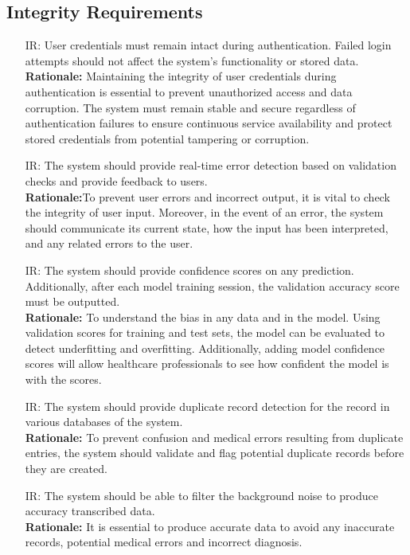 \documentclass{article}
\newcounter{irnum} %
\begin{document}
\subsection{Integrity Requirements}
\begin{itemize}
    \item [IR\refstepcounter{irnum}\theirnum \label{IR_Autentication}:] User credentials must remain intact during authentication. Failed login attempts should not affect the system's functionality or stored data.\\
    \textbf{Rationale:} Maintaining the integrity of user credentials during authentication is essential to prevent unauthorized access and data corruption. The system must remain stable and secure regardless of authentication failures to ensure continuous service availability and protect stored credentials from potential tampering or corruption.

    \item [IR\refstepcounter{irnum}\theirnum \label{IR_ErrorDetection}:] The system should provide real-time error detection based on validation checks and provide feedback to users.\\
    \textbf{Rationale:}To prevent user errors and incorrect output, it is vital to check the integrity of user input. Moreover, in the event of an error, the system should communicate its current state, how the input has been interpreted, and any related errors to the user.

    \item [IR\refstepcounter{irnum}\theirnum \label{IR_ValidationScore}:] The system should provide confidence scores on any prediction. Additionally, after each model training session, the validation accuracy score must be outputted.\\
    \textbf{Rationale:} To understand the bias in any data and in the model. Using validation scores for training and test sets, the model can be evaluated to detect underfitting and overfitting. Additionally, adding model confidence scores will allow healthcare professionals to see how confident the model is with the scores.
    
    \item [IR\refstepcounter{irnum}\theirnum \label{IR_DuplicateRecordDetection}:] The system should provide duplicate record detection for the record in various databases of the system.\\
    \textbf{Rationale:} To prevent confusion and medical errors resulting from duplicate entries, the system should validate and flag potential duplicate records before they are created.

    \item [IR\refstepcounter{irnum}\theirnum \label{IR_BackNoiseFilter}:] The system should be able to filter the background noise to produce accuracy transcribed data.\\
    \textbf{Rationale:} It is essential to produce accurate data to avoid any inaccurate records, potential medical errors and incorrect diagnosis. 

\end{itemize}
\end{document}
